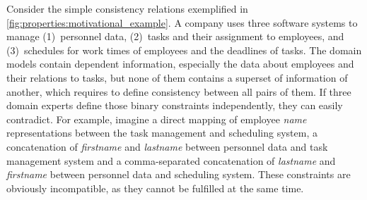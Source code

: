 
Consider the simple consistency relations exemplified in \autoref{fig:properties:motivational_example}.
A company uses three software systems to manage (1)~personnel data, (2)~tasks and their assignment to employees, and (3)~schedules for work times of employees and the deadlines of tasks.
The domain models contain dependent information, especially the data about employees and their relations to tasks, but none of them contains a superset of information of another, which requires to define consistency between all pairs of them.
If three domain experts define %
those binary constraints
independently, they can easily contradict. 
For example, imagine %
a direct mapping of employee \emph{name} representations between the task management and scheduling system, a concatenation of \emph{firstname} and \emph{lastname} between personnel data and task management system and a comma-separated concatenation of \emph{lastname} and \emph{firstname} between personnel data and scheduling system.
These constraints are obviously incompatible, as they cannot be fulfilled at the same time.

